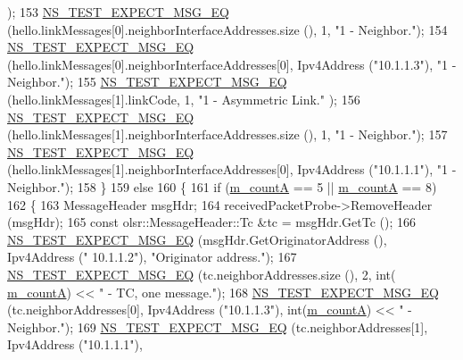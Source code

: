 \begin{DoxyCode}
      );
153       \hyperlink{group__testing_ga7304ba46a28d8cf08dfdfd6499cf7068}{NS\_TEST\_EXPECT\_MSG\_EQ} (hello.linkMessages[0].neighborInterfaceAddresses.size (),
       1, \textcolor{stringliteral}{"1 - Neighbor."});
154       \hyperlink{group__testing_ga7304ba46a28d8cf08dfdfd6499cf7068}{NS\_TEST\_EXPECT\_MSG\_EQ} (hello.linkMessages[0].neighborInterfaceAddresses[0], 
      Ipv4Address (\textcolor{stringliteral}{"10.1.1.3"}), \textcolor{stringliteral}{"1 - Neighbor."});
155       \hyperlink{group__testing_ga7304ba46a28d8cf08dfdfd6499cf7068}{NS\_TEST\_EXPECT\_MSG\_EQ} (hello.linkMessages[1].linkCode, 1, \textcolor{stringliteral}{"1 - Asymmetric Link."}
      );
156       \hyperlink{group__testing_ga7304ba46a28d8cf08dfdfd6499cf7068}{NS\_TEST\_EXPECT\_MSG\_EQ} (hello.linkMessages[1].neighborInterfaceAddresses.size (),
       1, \textcolor{stringliteral}{"1 - Neighbor."});
157       \hyperlink{group__testing_ga7304ba46a28d8cf08dfdfd6499cf7068}{NS\_TEST\_EXPECT\_MSG\_EQ} (hello.linkMessages[1].neighborInterfaceAddresses[0], 
      Ipv4Address (\textcolor{stringliteral}{"10.1.1.1"}), \textcolor{stringliteral}{"1 - Neighbor."});
158     \}
159   \textcolor{keywordflow}{else}
160     \{
161       \textcolor{keywordflow}{if} (\hyperlink{classns3_1_1olsr_1_1TcRegressionTest_ad4df9f9a1950da47355d1623fb2a57ed}{m\_countA} == 5 || \hyperlink{classns3_1_1olsr_1_1TcRegressionTest_ad4df9f9a1950da47355d1623fb2a57ed}{m\_countA} == 8)
162         \{
163           MessageHeader msgHdr;
164           receivedPacketProbe->RemoveHeader (msgHdr);
165           \textcolor{keyword}{const} olsr::MessageHeader::Tc &tc = msgHdr.GetTc ();
166           \hyperlink{group__testing_ga7304ba46a28d8cf08dfdfd6499cf7068}{NS\_TEST\_EXPECT\_MSG\_EQ} (msgHdr.GetOriginatorAddress (), Ipv4Address (\textcolor{stringliteral}{"
      10.1.1.2"}), \textcolor{stringliteral}{"Originator address."});
167           \hyperlink{group__testing_ga7304ba46a28d8cf08dfdfd6499cf7068}{NS\_TEST\_EXPECT\_MSG\_EQ} (tc.neighborAddresses.size (), 2, int(
      \hyperlink{classns3_1_1olsr_1_1TcRegressionTest_ad4df9f9a1950da47355d1623fb2a57ed}{m\_countA}) << \textcolor{stringliteral}{" - TC, one message."});
168           \hyperlink{group__testing_ga7304ba46a28d8cf08dfdfd6499cf7068}{NS\_TEST\_EXPECT\_MSG\_EQ} (tc.neighborAddresses[0], Ipv4Address (\textcolor{stringliteral}{"10.1.1.3"}), \textcolor{keywordtype}{
      int}(\hyperlink{classns3_1_1olsr_1_1TcRegressionTest_ad4df9f9a1950da47355d1623fb2a57ed}{m\_countA}) << \textcolor{stringliteral}{" - Neighbor."});
169           \hyperlink{group__testing_ga7304ba46a28d8cf08dfdfd6499cf7068}{NS\_TEST\_EXPECT\_MSG\_EQ} (tc.neighborAddresses[1], Ipv4Address (\textcolor{stringliteral}{"10.1.1.1"}), \textcolor{keywordtype}{
}
\end{DoxyCode}
